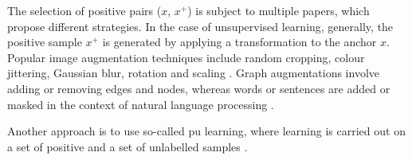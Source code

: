 The selection of positive pairs ($x$, $x^+$) is subject to multiple papers, 
which propose different strategies.
In the case of unsupervised learning, generally, 
the positive sample $x^+$ is generated by applying a transformation to the anchor $x$.
Popular image augmentation techniques include random cropping, colour jittering, Gaussian blur,
rotation and scaling \citet{adversarial_2020,robinson_contrastive_2021,curricular_weighting_2024}.
Graph augmentations involve adding or removing edges and nodes, 
whereas words or sentences are added or masked in the context of natural language processing 
\citet{curricular_weighting_2024}.

Another approach is to use so-called \ac{pu} learning, where learning is carried out 
on a set of positive and a set of unlabelled samples \citet{chuang_debiased_2020}.